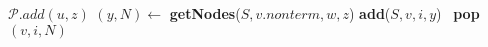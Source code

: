 \begin{algorithmic}   
        \State $\mathcal{P}.add(u,z)$
            \State $(y,N) \gets$ \textbf{getNodes}($S, v.nonterm, w, z$)
            \State \textbf{add}($S,v,i,y$)
                \ \textbf{pop}$(v,i,N)$ 
            \EndIf
        \EndFor
    \EndIf
\EndFunction
\end{algorithmic}